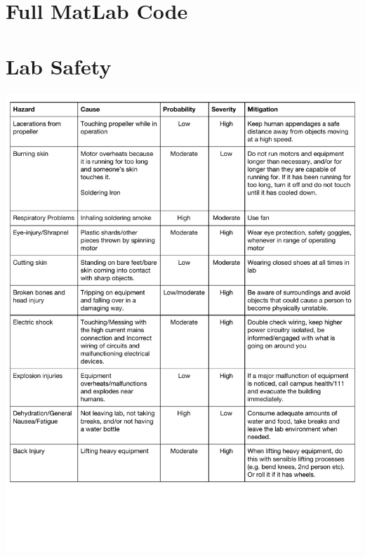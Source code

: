 \documentclass[a4paper,11pt]{article}
\begin{document}
\nocite{*}



\newpage

    \section{Full MatLab Code}
    
    \section{Lab Safety}
    \includegraphics[width=\textwidth]{inc/safety.pdf}
    
\end{document}
